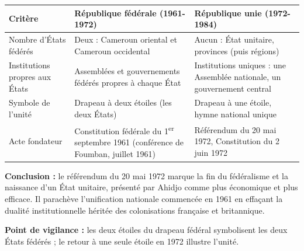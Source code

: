 \documentclass[11pt]{article}
\begin{document}
\begin{corrige}
\begin{center}
\begin{tabularx}{\linewidth}{|l|X|X|}\hline
\rowcolor{popblueL} Critère & République fédérale (1961-1972) & République unie (1972-1984) \\ \hline
Nombre d'États fédérés & Deux : Cameroun oriental et Cameroun occidental & Aucun : État unitaire, provinces (puis régions) \\ \hline
Institutions propres aux États & Assemblées et gouvernements fédérés propres à chaque État & Institutions uniques : une Assemblée nationale, un gouvernement central \\ \hline
Symbole de l'unité & Drapeau à deux étoiles (les deux États) & Drapeau à une étoile, hymne national unique \\ \hline
Acte fondateur & Constitution fédérale du 1\textsuperscript{er} septembre 1961 (conférence de Foumban, juillet 1961) & Référendum du 20 mai 1972, Constitution du 2 juin 1972 \\ \hline
\end{tabularx}
\end{center}
\textbf{Conclusion :} le référendum du 20 mai 1972 marque la fin du fédéralisme et la naissance d'un État unitaire, présenté par Ahidjo comme plus économique et plus efficace. Il parachève l'unification nationale commencée en 1961 en effaçant la dualité institutionnelle héritée des colonisations française et britannique.

\textbf{Point de vigilance :} les deux étoiles du drapeau fédéral symbolisent les deux États fédérés ; le retour à une seule étoile en 1972 illustre l'unité.
\end{corrige}
\end{document}
